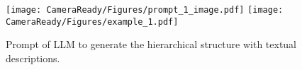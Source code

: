 \begin{figure*}
\centering
\texttt{[image: CameraReady/Figures/prompt\_1\_image.pdf]}
\texttt{[image: CameraReady/Figures/example\_1.pdf]}
\caption{Prompt of LLM to generate the hierarchical structure with textual descriptions.}
\label{fig:prompt_1}
\end{figure*}